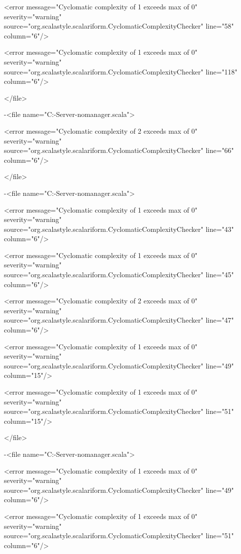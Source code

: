 \documentclass{scalatekids-article}
\begin{document}
<error message="Cyclomatic complexity of 1 exceeds max of 0" severity="warning" source="org.scalastyle.scalariform.CyclomaticComplexityChecker" line="58" column="6"/>

<error message="Cyclomatic complexity of 1 exceeds max of 0" severity="warning" source="org.scalastyle.scalariform.CyclomaticComplexityChecker" line="118" column="6"/>

</file>


-<file name="C:\Users\Davide\Desktop\Actorbase-Server-nomanager\src\main\scala\com\actorbase\actorsystem\clientactor\RestApi.scala">

<error message="Cyclomatic complexity of 2 exceeds max of 0" severity="warning" source="org.scalastyle.scalariform.CyclomaticComplexityChecker" line="66" column="6"/>

</file>


-<file name="C:\Users\Davide\Desktop\Actorbase-Server-nomanager\src\main\scala\com\actorbase\actorsystem\utils\KeyRange.scala">

<error message="Cyclomatic complexity of 1 exceeds max of 0" severity="warning" source="org.scalastyle.scalariform.CyclomaticComplexityChecker" line="43" column="6"/>

<error message="Cyclomatic complexity of 1 exceeds max of 0" severity="warning" source="org.scalastyle.scalariform.CyclomaticComplexityChecker" line="45" column="6"/>

<error message="Cyclomatic complexity of 2 exceeds max of 0" severity="warning" source="org.scalastyle.scalariform.CyclomaticComplexityChecker" line="47" column="6"/>

<error message="Cyclomatic complexity of 1 exceeds max of 0" severity="warning" source="org.scalastyle.scalariform.CyclomaticComplexityChecker" line="49" column="15"/>

<error message="Cyclomatic complexity of 1 exceeds max of 0" severity="warning" source="org.scalastyle.scalariform.CyclomaticComplexityChecker" line="51" column="15"/>

</file>


-<file name="C:\Users\Davide\Desktop\Actorbase-Server-nomanager\src\main\scala\com\actorbase\actorsystem\storefinder\Storefinder.scala">

<error message="Cyclomatic complexity of 1 exceeds max of 0" severity="warning" source="org.scalastyle.scalariform.CyclomaticComplexityChecker" line="49" column="6"/>

<error message="Cyclomatic complexity of 1 exceeds max of 0" severity="warning" source="org.scalastyle.scalariform.CyclomaticComplexityChecker" line="51" column="6"/>
\end{document}
